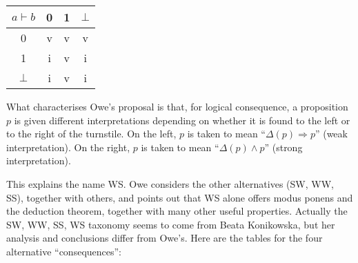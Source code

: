 \documentclass{llncs}
\newcommand{\impl}{\mathbin{\Rightarrow}}
\begin{document}
\begin{center}
\begin{tabular}{|c|ccc|}
\hline
   $a \vdash b$ & 0 & 1 & $\bot$
\\ \hline
   0      & v & v & v
\\ 1      & i & v & i
\\ $\bot$ & i & v & i
\\ \hline
\end{tabular}
\end{center}
%
What characterises Owe's proposal is that, for logical consequence,
a proposition $p$ is given
different interpretations depending on whether it is found
to the left or to the right of the turnstile.
On the left, $p$ is taken to mean ``$\Delta(p) \impl p$'' (weak interpretation).
On the right, $p$ is taken to mean ``$\Delta(p) \land p$'' (strong interpretation).

This explains the name WS.
Owe considers the other alternatives (SW, WW, SS), together with others,
and points out that WS alone offers modus ponens and the deduction theorem,
together with many other useful properties.
Actually the SW, WW, SS, WS taxonomy seems to come from Beata Konikowska,
but her analysis and conclusions differ from Owe's.
Here are the tables for the four alternative ``consequences'':
\end{document}
